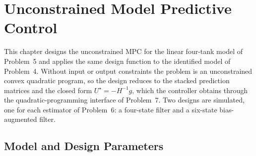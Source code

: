 \chapter{Unconstrained Model Predictive Control}
\label{chap:problem8}

This chapter designs the unconstrained MPC for the linear four-tank model of
Problem~5 and applies the same design function to the identified model of
Problem~4. Without input or output constraints the problem is an unconstrained
convex quadratic program, so the design reduces to the stacked prediction
matrices and the closed form $U^\star=-H^{-1}g$, which the controller obtains
through the quadratic-programming interface of Problem~7. Two designs are
simulated, one for each estimator of Problem~6: a four-state filter and a
six-state bias-augmented filter.

\section{Model and Design Parameters}
\label{sec:p8-model}

